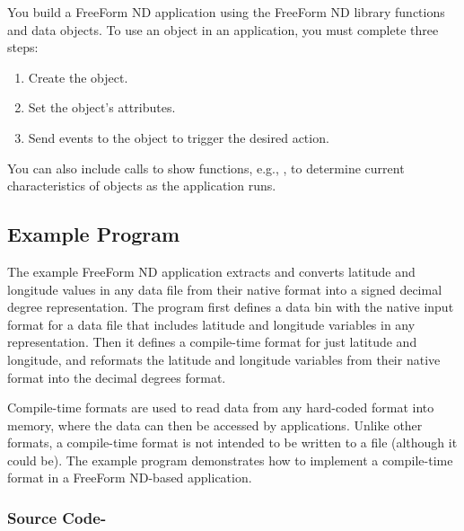 You build a FreeForm ND application using the FreeForm ND library
functions and data objects. To use an object in an application, you
must complete three steps:

\begin{enumerate}
\item Create the object. 

\item Set the object's attributes. 

\item Send events to the object to trigger the desired action. 
\end{enumerate}

You can also include calls to show functions, e.g., , to
determine current characteristics of objects as the application runs.

\subsection{Example Program}

The example FreeForm ND application  extracts and
converts latitude and longitude values in any data file from their
native format into a signed decimal degree representation. The program
first defines a data bin with the native input format for a data file
that includes latitude and longitude variables in any representation.
Then it defines a compile-time format for just latitude and longitude,
and reformats the latitude and longitude variables from their native
format into the decimal degrees format.

Compile-time formats are used to read data from any hard-coded format
into memory, where the data can then be accessed by applications.
Unlike other formats, a compile-time format is not intended to be
written to a file (although it could be). The example program
 demonstrates how to implement a compile-time format in a
FreeForm ND-based application.


\subsubsection{Source Code-}
\nopagebreak
\T\bgroup
\T\footnotesize

